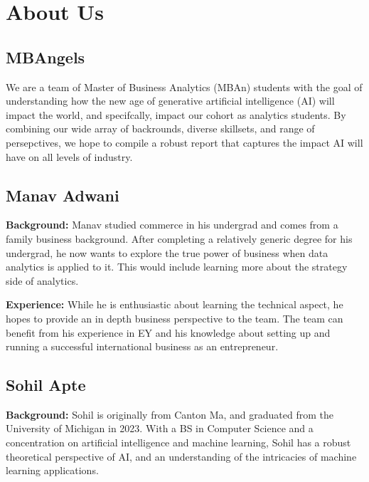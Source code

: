 \documentclass[
]{book}
\begin{document}
\hypertarget{about-us}{%
\chapter{About Us}\label{about-us}}

\hypertarget{mbangels}{%
\section{MBAngels}\label{mbangels}}

We are a team of Master of Business Analytics (MBAn) students with the goal of understanding how the new age of generative artificial intelligence (AI) will impact the world, and specifcally, impact our cohort as analytics students. By combining our wide array of backrounds, diverse skillsets, and range of persepctives, we hope to compile a robust report that captures the impact AI will have on all levels of industry.

\hypertarget{manav-adwani}{%
\section{Manav Adwani}\label{manav-adwani}}

\textbf{Background:}
Manav studied commerce in his undergrad and comes from a family business background. After completing a relatively generic degree for his undergrad, he now wants to explore the true power of business when data analytics is applied to it. This would include learning more about the strategy side of analytics.

\textbf{Experience:}
While he is enthusiastic about learning the technical aspect, he hopes to provide an in depth business perspective to the team. The team can benefit from his experience in EY and his knowledge about setting up and running a successful international business as an entrepreneur.

\hypertarget{sohil-apte}{%
\section{Sohil Apte}\label{sohil-apte}}

\textbf{Background:}
Sohil is originally from Canton Ma, and graduated from the University of Michigan in 2023. With a BS in Computer Science and a concentration on artificial intelligence and machine learning, Sohil has a robust theoretical perspective of AI, and an understanding of the intricacies of machine learning applications.
\end{document}

